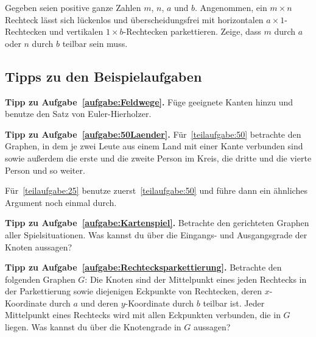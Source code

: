 \begin{aufgabe*}[***]\label{aufgabe:Rechtecksparkettierung}
	Gegeben seien positive ganze Zahlen $m$, $n$, $a$ und $b$. Angenommen, ein $m\times n$ Rechteck lässt sich lückenlos und überscheidungsfrei mit horizontalen $a\times1$-Rechtecken und vertikalen $1\times b$-Rechtecken parkettieren. Zeige, dass $m$ durch $a$ oder $n$ durch $b$ teilbar sein muss.
\end{aufgabe*}
\subsection*{Tipps zu den Beispielaufgaben}
\textbf{Tipp zu Aufgabe~\ref{aufgabe:Feldwege}.} Füge geeignete Kanten hinzu und benutze den Satz von Euler-Hierholzer.

\textbf{Tipp zu Aufgabe~\ref{aufgabe:50Laender}.} Für~\ref{teilaufgabe:50} betrachte den Graphen, in dem je zwei Leute aus einem Land mit einer Kante verbunden sind sowie außerdem die erste und die zweite Person im Kreis, die dritte und die vierte Person und so weiter.

Für~\ref{teilaufgabe:25} benutze zuerst~\ref{teilaufgabe:50} und führe dann ein ähnliches Argument noch einmal durch.

\textbf{Tipp zu Aufgabe~\ref{aufgabe:Kartenspiel}.} Betrachte den gerichteten Graphen aller Spielsituationen. Was kannst du über die Eingangs- und Ausgangsgrade der Knoten aussagen?

\textbf{Tipp zu Aufgabe~\ref{aufgabe:Rechtecksparkettierung}.} Betrachte den folgenden Graphen $G$: Die Knoten sind der Mittelpunkt eines jeden Rechtecks in der Parkettierung sowie diejenigen Eckpunkte von Rechtecken, deren $x$-Koordinate durch $a$ und deren $y$-Koordinate durch $b$ teilbar ist. Jeder Mittelpunkt eines Rechtecks wird mit allen Eckpunkten verbunden, die in $G$ liegen. Was kannst du über die Knotengrade in $G$ aussagen?
